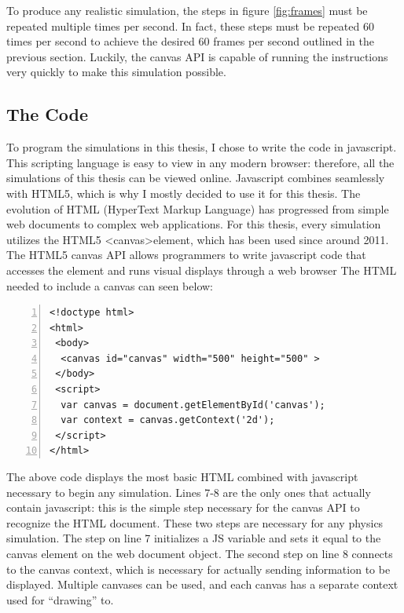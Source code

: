 To produce any realistic simulation, the steps in figure \ref{fig:frames} must be repeated multiple times per second.  In fact, these steps must be repeated 60 times per second to achieve the desired 60 frames per second outlined in the previous section.  Luckily, the canvas API is capable of running the instructions very quickly to make this simulation possible.  










\subsection{The Code}

To program the simulations in this thesis, I chose to write the code in javascript.  This scripting language is easy to view in any modern browser: therefore, all the simulations of this thesis can be viewed online.  Javascript combines seamlessly with HTML5, which is why I mostly decided to use it for this thesis.  The evolution of HTML (HyperText Markup Language) has progressed from simple web documents to complex web applications.  For this thesis, every simulation utilizes the HTML5 \textless canvas\textgreater element, which has been used since around 2011.  The HTML5 canvas API allows programmers to write javascript code that accesses the element and runs visual displays through a web browser  The HTML needed to include a canvas can seen below:



\vspace{1cm}
\begin{lstlisting}[breaklines=true, frame=single, numbers=left, caption= The bare bones code necessary for an HTML document to include the canvas element.  The canvas in this situation is a 500 pixel square., label=lst:basichtml]  
<!doctype html>
<html>
 <body>
  <canvas id="canvas" width="500" height="500" >  
 </body>
 <script>
  var canvas = document.getElementById('canvas');
  var context = canvas.getContext('2d');
 </script>
</html>

\end{lstlisting}

The above code displays the most basic HTML combined with javascript necessary to begin any simulation.  Lines 7-8 are the only ones that actually contain javascript: this is the simple step necessary for the canvas API to recognize the HTML document.  These two steps are necessary for any physics simulation.  The step on line 7 initializes a JS variable and sets it equal to the canvas element on the web document object.  The second step on line 8 connects to the canvas context, which is necessary for actually sending information to be displayed.  Multiple canvases can be used, and each canvas has a separate context used for ``drawing'' to. 

